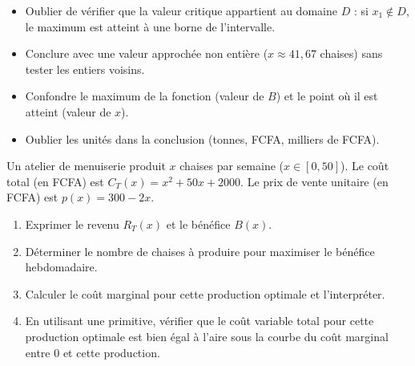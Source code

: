 \documentclass[11pt]{article}
\begin{document}
\begin{attention}
\begin{itemize}
    \item Oublier de vérifier que la valeur critique appartient au domaine $D$ : si $x_1 \notin D$, le maximum est atteint à une borne de l'intervalle.
    \item Conclure avec une valeur approchée non entière ($x \approx 41,67$ chaises) sans tester les entiers voisins.
    \item Confondre le maximum de la fonction (valeur de $B$) et le point où il est atteint (valeur de $x$).
    \item Oublier les unités dans la conclusion (tonnes, FCFA, milliers de FCFA).
\end{itemize}
\end{attention}

\begin{exercice}
Un atelier de menuiserie produit $x$ chaises par semaine ($x \in [0, 50]$).
Le coût total (en FCFA) est $C_T(x) = x^2 + 50x + 2000$.
Le prix de vente unitaire (en FCFA) est $p(x) = 300 - 2x$.
\begin{enumerate}
    \item Exprimer le revenu $R_T(x)$ et le bénéfice $B(x)$.
    \item Déterminer le nombre de chaises à produire pour maximiser le bénéfice hebdomadaire.
    \item Calculer le coût marginal pour cette production optimale et l'interpréter.
    \item En utilisant une primitive, vérifier que le coût variable total pour cette production optimale est bien égal à l'aire sous la courbe du coût marginal entre $0$ et cette production.
\end{enumerate}
\end{exercice}
\end{document}

